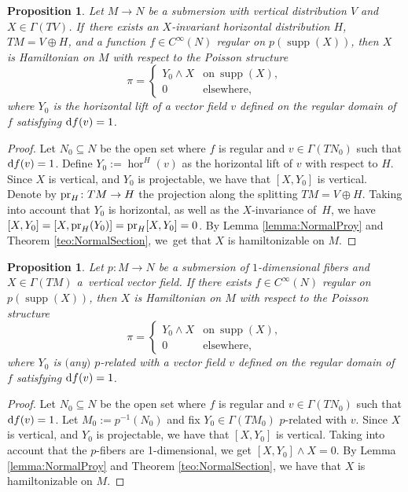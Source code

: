 \documentclass[10pt,a4paper]{amsart}
\newcommand{\dd}{{\rm d}}
\numberwithin{equation}{section}
\newtheorem{Proposition}[Theorem]{Proposition}
 { \theoremstyle{definition}
\newtheorem{Definition}[Theorem]{Definition}
\newtheorem{Note}[Theorem]{Note}
\newtheorem{Example}[Theorem]{Example}
\newtheorem{Remark}[Theorem]{Remark} }
\begin{document}
\begin{Proposition}\label{prop:HinvHam}
Let $M \to N$ be a submersion with vertical distribution $V$ and $X \in \Gamma(TV)$. If~there exists an $X$-invariant horizontal distribution $H$, $TM = V \oplus H$, and a function $f \in C^{\infty}(N)$ regular on $p(\operatorname{supp}(X))$, then $X$ is Hamiltonian on $M$ with respect to the Poisson structure
 \begin{equation*}
 \pi = \begin{cases}
 Y_0 \wedge X & \text{on} \ \operatorname{supp}(X),\\
 0 & \text{elsewhere},
 \end{cases}
 \end{equation*}
where $Y_{0}$ is the horizontal lift of a vector field $v$ defined on the regular domain of $f$ satisfying $\dd f(v)=1$.
\end{Proposition}
\begin{proof}
Let $N_0 \subseteq N$ be the open set where $f$ is regular and $v \in \Gamma(TN_{0})$ such that $\dd{f}(v) = 1$. Define $Y_{0}:=\operatorname{hor}^H(v)$ as the horizontal lift of $v$ with respect to $H$. Since $X$ is vertical, and $Y_0$ is projectable, we have that $[X,Y_0]$ is vertical. Denote by ${\rm pr}_{H}\colon TM \to H$ the projection along the splitting $TM=V \oplus H$. Taking into account that $Y_0$ is horizontal, as well as the $X$-invariance of~$H$, we have $[X,Y_0] = [X,{\rm pr}_{H}(Y_0)] = {\rm pr}_{H}[X,Y_0] = 0$. By Lemma \ref{lemma:NormalProy} and Theorem \ref{teo:NormalSection}, we~get that $X$ is hamiltonizable on $M$.
\end{proof}

\begin{Proposition}\label{prop:HTransInv2}
Let $p\colon M \to N$ be a submersion of $1$-dimensional fibers and $X \in \Gamma(TM)$ a~ver\-ti\-cal vector field. If there exists $f \in C^{\infty}(N)$ regular on $p(\operatorname{supp}(X))$, then $X$ is Hamiltonian on $M$ with respect to the Poisson structure
 \begin{equation*}
 \pi = \begin{cases}
 Y_0 \wedge X & \text{on}  \  \operatorname{supp}(X),
 \\
 0 & \text{elsewhere},
 \end{cases}
 \end{equation*}
where $Y_{0}$ is $($any$)$ $p$-related with a vector field $v$ defined on the regular domain of $f$ satisfying $\dd f(v)=1$.
\end{Proposition}
\begin{proof}
Let $N_0 \subseteq N$ be the open set where $f$ is regular and $v \in \Gamma(TN_{0})$ such that $\dd{f}(v) = 1$. Let $M_0:=p^{-1}(N_0)$ and fix $Y_{0} \in \Gamma(TM_{0})$ $p$-related with $v$. Since $X$ is vertical, and $Y_0$ is projectable, we have that $[X,Y_0]$ is vertical. Taking into account that the $p$-fibers are 1-dimensional, we get $[X,Y_0]\wedge X=0$. By Lemma \ref{lemma:NormalProy} and Theorem \ref{teo:NormalSection}, we have that $X$ is hamiltonizable on $M$.
\end{proof}
\end{document}
